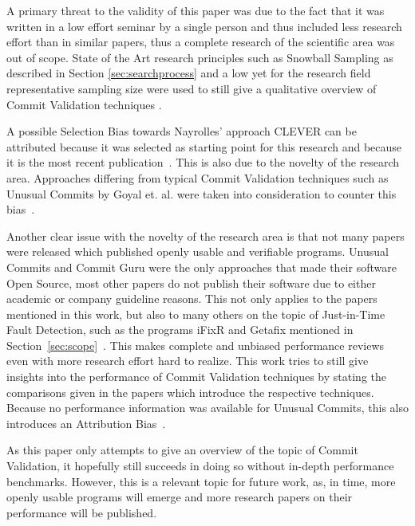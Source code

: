 A primary threat to the validity of this paper was due to the fact that it was written in a low effort seminar by a single person and thus included less research effort than in similar papers, thus a complete research of the scientific area was out of scope. State of the Art research principles such as Snowball Sampling as described in Section \ref{sec:searchprocess} and a low yet for the research field representative sampling size were used to still give a qualitative overview of Commit Validation techniques \cite{10.2307/2237615}.

A possible Selection Bias towards Nayrolles' approach CLEVER can be attributed because it was selected as starting point for this research and because it is the most recent publication~\cite{Nayrolles2018}. This is also due to the novelty of the research area. Approaches differing from typical Commit Validation techniques such as Unusual Commits by Goyal et. al. were taken into consideration to counter this bias~\cite{Goyal2017}.

Another clear issue with the novelty of the research area is that not many papers were released which published openly usable and verifiable programs. Unusual Commits and Commit Guru were the only approaches that made their software Open Source, most other papers do not publish their software due to either academic or company guideline reasons. This not only applies to the papers mentioned in this work, but also to many others on the topic of Just-in-Time Fault Detection, such as the programs iFixR and Getafix mentioned in Section~\ref{sec:scope}~\cite{Koyuncu2019,Bader2019}. This makes complete and unbiased performance reviews even with more research effort hard to realize. This work tries to still give insights into the performance of Commit Validation techniques by stating the comparisons given in the papers which introduce the respective techniques. Because no performance information was available for Unusual Commits, this also introduces an Attribution Bias~\cite{Goyal2017}.

As this paper only attempts to give an overview of the topic of Commit Validation, it hopefully still succeeds in doing so without in-depth performance benchmarks. However, this is a relevant topic for future work, as, in time, more openly usable programs will emerge and more research papers on their performance will be published.


